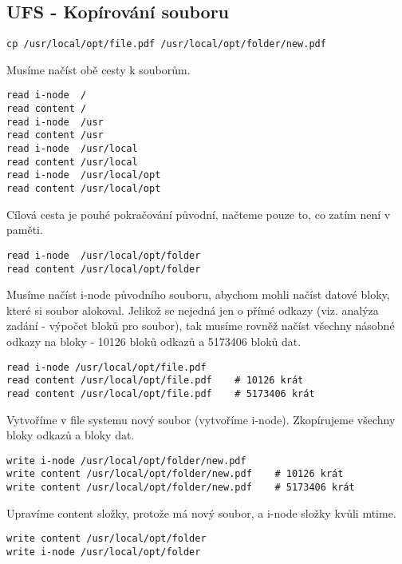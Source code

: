 \subsection{UFS - Kopírování souboru}

\begin{verbatim}
cp /usr/local/opt/file.pdf /usr/local/opt/folder/new.pdf
\end{verbatim}

Musíme načíst obě cesty k souborům.
\begin{verbatim}
read i-node  /
read content /
read i-node  /usr
read content /usr
read i-node  /usr/local
read content /usr/local
read i-node  /usr/local/opt
read content /usr/local/opt
\end{verbatim}

Cílová cesta je pouhé pokračování původní, načteme pouze to, co zatím není v paměti.
\begin{verbatim}
read i-node  /usr/local/opt/folder
read content /usr/local/opt/folder
\end{verbatim}

Musíme načíst i-node původního souboru, abychom mohli načíst datové bloky, které si soubor alokoval. Jelikož se nejedná jen o přímé odkazy (viz. analýza zadání - výpočet bloků pro soubor), tak musíme rovněž načíst všechny násobné odkazy na bloky - 10126 bloků odkazů a 5173406 bloků dat.
\begin{verbatim}
read i-node /usr/local/opt/file.pdf
read content /usr/local/opt/file.pdf    # 10126 krát
read content /usr/local/opt/file.pdf    # 5173406 krát
\end{verbatim}

Vytvoříme v file systemu nový soubor (vytvoříme i-node). Zkopírujeme všechny bloky odkazů a bloky dat.
\begin{verbatim}
write i-node /usr/local/opt/folder/new.pdf
write content /usr/local/opt/folder/new.pdf    # 10126 krát
write content /usr/local/opt/folder/new.pdf    # 5173406 krát
\end{verbatim}

Upravíme content složky, protože má nový soubor, a i-node složky kvůli mtime.
\begin{verbatim}
write content /usr/local/opt/folder
write i-node /usr/local/opt/folder
\end{verbatim}

